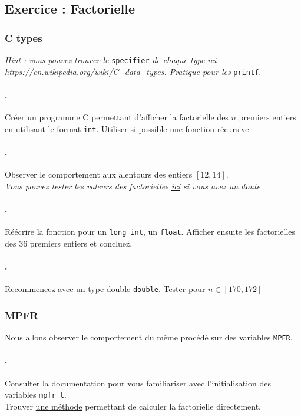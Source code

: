 \documentclass[a4paper,11pt]{exam}
\begin{document}
\setcounter{enumi}{1}
\subsection{Exercice \theenumi : Factorielle}
\subsubsection{C types}
\emph{Hint : vous pouvez trouver le }\verb=specifier= \emph{de chaque type ici \url{https://en.wikipedia.org/wiki/C_data_types}. Pratique pour les} \verb=printf=.
\setcounter{enumii}{1}
\paragraph{\theenumii.} 
Créer un programme C permettant d'afficher la factorielle des $n$ premiers entiers en utilisant le format \verb=int=. Utiliser si possible une fonction récursive. 
\paragraph{\theenumii.} 
Observer le comportement aux alentours des entiers $[12, 14]$. \\
\emph{Vous pouvez tester les valeurs des factorielles \href{https://fr.numberempire.com/factorialcalculator.php}{ici} si vous avez un doute}
\paragraph{\theenumii.} 
Réécrire la fonction pour un \verb=long int=, un \verb=float=. Afficher ensuite les factorielles des 36 premiers entiers et concluez.
\paragraph{\theenumii.} 
Recommencez avec un type double \verb=double=. Tester pour $n \in \left[ 170, 172 \right]$

\subsubsection{MPFR}
\setcounter{enumii}{1}
Nous allons observer le comportement du même procédé sur des variables \verb=MPFR=.
\paragraph{\theenumii.} 
Consulter la documentation pour vous familiariser avec l'initialisation des variables \verb=mpfr_t=. \\
Trouver \href{http://www.mpfr.org/mpfr-current/mpfr.html#index-mpfr_005ffac_005fui}{une méthode} permettant de calculer la factorielle directement.
\end{document}
